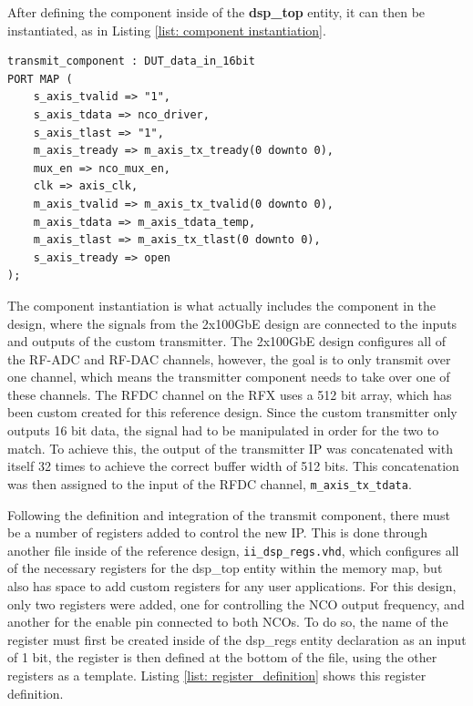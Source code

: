 \documentclass[12pt, a4paper]{article}
\begin{document}
After defining the component inside of the \textbf{dsp\_top} entity, it can then be instantiated, as in Listing \ref{list: component instantiation}.

\begin{listing}[h!]
\begin{verbatim}
transmit_component : DUT_data_in_16bit
PORT MAP (
    s_axis_tvalid => "1",
    s_axis_tdata => nco_driver,
    s_axis_tlast => "1",
    m_axis_tready => m_axis_tx_tready(0 downto 0),
    mux_en => nco_mux_en,
    clk => axis_clk,
    m_axis_tvalid => m_axis_tx_tvalid(0 downto 0),
    m_axis_tdata => m_axis_tdata_temp,
    m_axis_tlast => m_axis_tx_tlast(0 downto 0),
    s_axis_tready => open
);
\end{verbatim}
\caption{VHDL Transmitter Component Instantiation}
\label{list: component instantiation}
\end{listing}

The component instantiation is what actually includes the component in the design, where the signals from the 2x100GbE design are connected to the inputs and outputs of the custom transmitter. The 2x100GbE design configures all of the RF-ADC and RF-DAC channels, however, the goal is to only transmit over one channel, which means the transmitter component needs to take over one of these channels. The RFDC channel on the RFX uses a 512 bit array, which has been custom created for this reference design. Since the custom transmitter only outputs 16 bit data, the signal had to be manipulated in order for the two to match. To achieve this, the output of the transmitter IP was concatenated with itself 32 times to achieve the correct buffer width of 512 bits. This concatenation was then assigned to the input of the RFDC channel, \texttt{m\_axis\_tx\_tdata}.

Following the definition and integration of the transmit component, there must be a number of registers added to control the new IP. This is done through another file inside of the reference design, \texttt{ii\_dsp\_regs.vhd}, which configures all of the necessary registers for the dsp\_top entity within the memory map, but also has space to add custom registers for any user applications. For this design, only two registers were added, one for controlling the NCO output frequency, and another for the enable pin connected to both NCOs. To do so, the name of the register must first be created inside of the dsp\_regs entity declaration as an input of 1 bit, the register is then defined at the bottom of the file, using the other registers as a template. Listing \ref{list: register_definition} shows this register definition.
\end{document}
